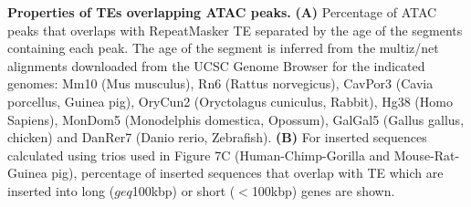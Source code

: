 \textbf{Properties of TEs overlapping ATAC peaks.} 
\textbf{(A)} Percentage of ATAC peaks that overlaps with RepeatMasker TE separated by the age of the segments containing each peak. The age of the segment is inferred from the multiz/net alignments downloaded from the UCSC Genome Browser for the indicated genomes: Mm10 (Mus musculus), Rn6 (Rattus norvegicus), CavPor3 (Cavia porcellus, Guinea pig), OryCun2 (Oryctolagus cuniculus, Rabbit), Hg38 (Homo Sapiens), MonDom5 (Monodelphis domestica, Opossum), GalGal5 (Gallus gallus, chicken) and DanRer7 (Danio rerio, Zebrafish). 
\textbf{(B)} For inserted sequences calculated using trios used in Figure 7C (Human-Chimp-Gorilla and Mouse-Rat-Guinea pig), percentage of inserted sequences that overlap with TE which are inserted into long ($geq$100kbp) or short ($<$100kbp) genes are shown. 